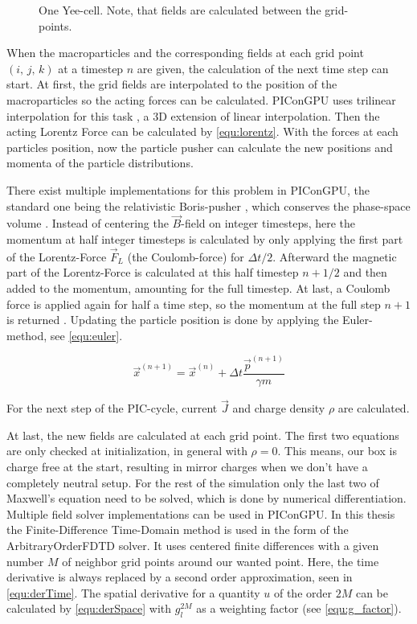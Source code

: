 \documentclass[bachelor_thesis]{subfiles}
\begin{document}
\begin{figure}
	\centering
	\missingfigure{}
	\caption{One Yee-cell. Note, that fields are calculated between the grid-points.}
	\label{fig:cell}
\end{figure}

When the macroparticles and the corresponding fields at each grid point $(i, \, j, \,k)$ at a timestep $n$ are given, the calculation of the next time step can start.
At first, the grid fields are interpolated to the position of the macroparticles so the acting forces can be calculated. PIConGPU uses trilinear interpolation for this task \cite{Huebl2019, PICRepo}, a 3D extension of linear interpolation.
Then the acting Lorentz Force can be calculated by \autoref{equ:lorentz}. With the forces at each particles position, now the particle pusher can calculate the new positions and momenta of the particle distributions.

There exist multiple implementations for this problem in PIConGPU, the standard one being the relativistic Boris-pusher \cite{Boris1970}, which conserves the phase-space volume \cite{PICRepo}. Instead of centering the $\vec{B}$-field on integer timesteps, here the momentum at half integer timesteps is
calculated by only applying the first part of the Lorentz-Force $\vec{F}_L$ (the Coulomb-force) for $\Delta t/2$. Afterward the magnetic part of the Lorentz-Force is calculated at this half timestep $n+1/2$ and then added to the momentum, amounting for the full timestep.
At last, a Coulomb force is applied again for half a time step, so the momentum at the full step $n+1$ is returned \cite{Zenitani2018, Pausch2019}. Updating the particle position is done by applying the Euler-method, see \autoref{equ:euler}.

\begin{equation}
	\vec{x}^{(n+1)} = \vec{x}^{(n)} + \Delta t \frac{\vec{p}^{(n+1)}}{\gamma m}
	\label{equ:euler}
\end{equation}

For the next step of the PIC-cycle, current $\vec{J}$ and charge density $\rho$ are calculated. 

At last, the new fields are calculated at each grid point. The first two equations are only checked at initialization, in general with $\rho=0$. This means, our box is charge free at the start, resulting in mirror charges when we don't have a completely neutral setup.
For the rest of the simulation only the last two of Maxwell's equation need to be solved, which is done by numerical differentiation. 
Multiple field solver implementations can be used in PIConGPU. In this thesis the Finite-Difference Time-Domain method is used in the form of the ArbitraryOrderFDTD solver. It uses centered finite differences with a given number $M$ of neighbor grid points around our wanted point.
Here, the time derivative is always replaced by a second order approximation, seen in \autoref{equ:derTime}. The spatial derivative for a quantity $u$ of the order $2M$ can be calculated by \autoref{equ:derSpace} with $g_l^{2M}$ as a weighting factor (see \autoref{equ:g_factor}).
\end{document}
